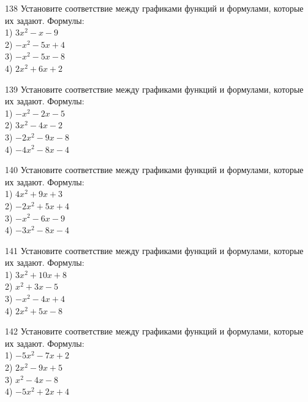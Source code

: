 \documentclass[4apaper]{article}
\begin{document}
\begin{taskBN}{138}
Установите соответствие между графиками функций и формулами, которые их задают. Формулы: \\1) $3x^2-x-9$\\2) $-x^2-5x+4$\\3) $-x^2-5x-8$\\4) $2x^2+6x+2$
\end{taskBN}

\begin{taskBN}{139}
Установите соответствие между графиками функций и формулами, которые их задают. Формулы: \\1) $-x^2-2x-5$\\2) $3x^2-4x-2$\\3) $-2x^2-9x-8$\\4) $-4x^2-8x-4$
\end{taskBN}

\begin{taskBN}{140}
Установите соответствие между графиками функций и формулами, которые их задают. Формулы: \\1) $4x^2+9x+3$\\2) $-2x^2+5x+4$\\3) $-x^2-6x-9$\\4) $-3x^2-8x-4$
\end{taskBN}

\begin{taskBN}{141}
Установите соответствие между графиками функций и формулами, которые их задают. Формулы: \\1) $3x^2+10x+8$\\2) $x^2+3x-5$\\3) $-x^2-4x+4$\\4) $2x^2+5x-8$
\end{taskBN}

\begin{taskBN}{142}
Установите соответствие между графиками функций и формулами, которые их задают. Формулы: \\1) $-5x^2-7x+2$\\2) $2x^2-9x+5$\\3) $x^2-4x-8$\\4) $-5x^2+2x+4$
\end{taskBN}
\end{document}
